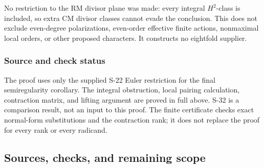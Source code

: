 No restriction to the RM divisor plane was made: every integral
\(H^2\)-class is included, so extra CM divisor classes cannot evade the
conclusion. This does not exclude even-degree polarizations, even-order
effective finite actions, nonmaximal local orders, or other proposed
characters. It constructs no eightfold supplier.

\subsubsection{Source and check status}\label{source-and-check-status}

The proof uses only the supplied S-22 Euler restriction for the final
semiregularity corollary. The integral obstruction, local pairing
calculation, contraction matrix, and lifting argument are proved in full
above. S-32 is a comparison result, not an input to this proof. The
finite certificate checks exact normal-form substitutions and the
contraction rank; it does not replace the proof for every rank or every
radicand.

\subsection{Sources, checks, and remaining
scope}\label{sources-checks-and-remaining-scope}

